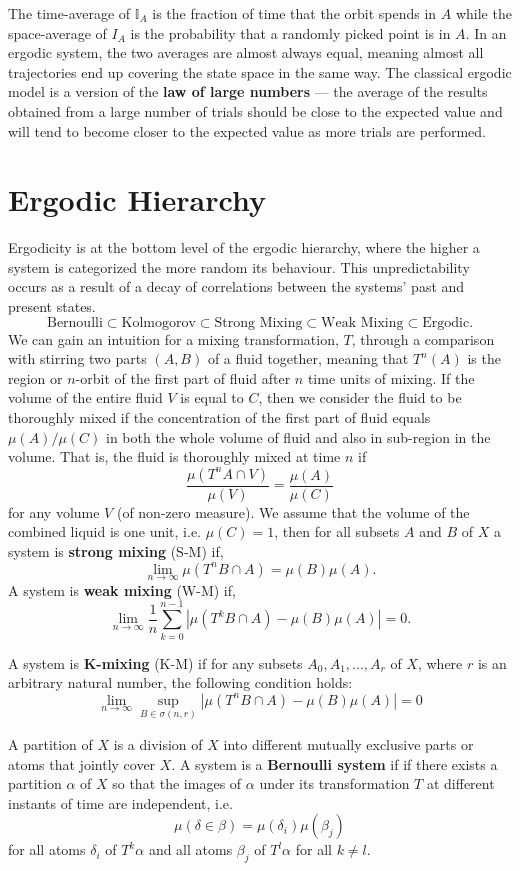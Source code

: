 \documentclass{article}
\begin{document}
The time-average of $\mathbb I_A$ is the fraction of time that the orbit spends in $A$ while the space-average of $I_A$ is the probability that a randomly picked point is in $A$. In an ergodic system, the two averages are almost always equal, meaning almost all trajectories end up covering the state space in the same way. The classical ergodic model is a version of the \textbf{law of large numbers} --- the average of the results obtained from a large number of trials should be close to the expected value and will tend to become closer to the expected value as more trials are performed.

\section{Ergodic Hierarchy}
Ergodicity is at the bottom level of the ergodic hierarchy, where the higher a system is categorized the more random its behaviour. This unpredictability occurs as a result of a decay of correlations between the systems’ past and present states.
\[
\text{Bernoulli} \subset \text{Kolmogorov} \subset \text{Strong Mixing} \subset \text{Weak Mixing} \subset \text{Ergodic}.
\]
We can gain an intuition for a mixing transformation, $T$, through a comparison with stirring two parts $(A, B)$ of a fluid together, meaning that $T^n(A)$ is the region or $n$-orbit of the first part of fluid after $n$ time units of mixing. If the volume of the entire fluid $V$ is equal to $C$, then we consider the fluid to be thoroughly mixed if the concentration of the first part of fluid equals $\mu(A)/\mu(C)$ in both the whole volume of fluid and also in sub-region in the volume. That is, the fluid is thoroughly mixed at time $n$ if
\[
    \frac{\mu(T^n A \cap V)}{\mu(V)}=\frac{\mu(A)}{\mu(C)}
\]
for any volume $V$ (of non-zero measure). We assume that the volume of the combined liquid is one unit, i.e. $\mu(C)=1$, then for all subsets $A$ and $B$ of $X$ a system is \textbf{strong mixing} (S-M) if,
\[
    \displaystyle \lim_{n\to\infty} \mu(T^n B \cap A) = \mu(B) \mu(A).
\]
A system is \textbf{weak mixing} (W-M) if,
\[
    \displaystyle \lim_{n\to \infty} \frac{1}{n} 
        \sum_{k=0}^{n-1} | \mu(T^k B \cap A) - \mu(B)\mu(A)|=0.
\]

A system is \textbf{K-mixing} (K-M) if for any subsets $A_0,A_1,...,A_r$ of $X$, where $r$ is an arbitrary natural number, the following condition holds:
\[
    \lim_{n\to\infty}
        \sup_{B \in \sigma(n,r)} 
        |\mu(T^n B \cap A) - \mu(B)\mu(A)| = 0
\]

A partition of $X$ is a division of $X$ into different mutually exclusive parts or atoms that jointly cover $X$. A system is a \textbf{Bernoulli system} if if there exists a partition $\alpha$ of $X$ so that the images of $\alpha$ under its transformation $T$ at different instants of time are independent, i.e.
\[
    \mu(\delta \in \beta) = \mu(\delta_i) \mu(\beta_j)
\]
for all atoms $\delta_i$ of $T^k\alpha$ and all atoms $\beta_j$ of $T^l\alpha$ for all $k \neq l$.
\end{document}
